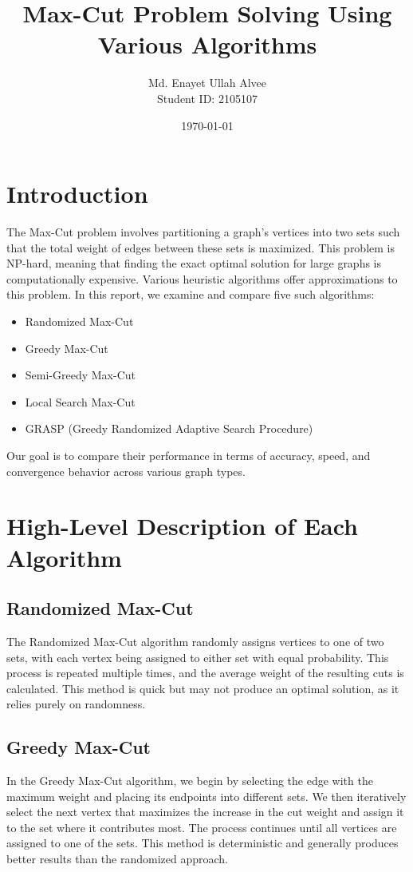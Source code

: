 \documentclass[a4paper,12pt]{article}
\title{\vspace{-3cm} \textbf{Max-Cut Problem Solving Using Various Algorithms} \vspace{-0.5cm}}
\author{Md. Enayet Ullah Alvee \\ Student ID: 2105107}
\date{\today}
\begin{document}
\maketitle

\section*{Introduction}

The Max-Cut problem involves partitioning a graph's vertices into two sets such that the total weight of edges between these sets is maximized. This problem is NP-hard, meaning that finding the exact optimal solution for large graphs is computationally expensive. Various heuristic algorithms offer approximations to this problem. In this report, we examine and compare five such algorithms:

\begin{itemize}
    \item Randomized Max-Cut
    \item Greedy Max-Cut
    \item Semi-Greedy Max-Cut
    \item Local Search Max-Cut
    \item GRASP (Greedy Randomized Adaptive Search Procedure)
\end{itemize}

Our goal is to compare their performance in terms of accuracy, speed, and convergence behavior across various graph types.

\section*{High-Level Description of Each Algorithm}

\subsection*{Randomized Max-Cut}
The Randomized Max-Cut algorithm randomly assigns vertices to one of two sets, with each vertex being assigned to either set with equal probability. This process is repeated multiple times, and the average weight of the resulting cuts is calculated. This method is quick but may not produce an optimal solution, as it relies purely on randomness.

\subsection*{Greedy Max-Cut}
In the Greedy Max-Cut algorithm, we begin by selecting the edge with the maximum weight and placing its endpoints into different sets. We then iteratively select the next vertex that maximizes the increase in the cut weight and assign it to the set where it contributes most. The process continues until all vertices are assigned to one of the sets. This method is deterministic and generally produces better results than the randomized approach.
\end{document}

